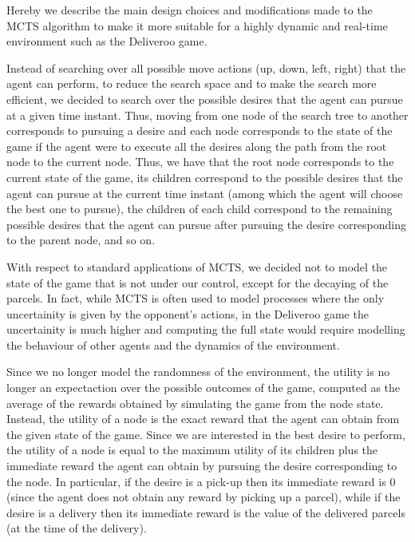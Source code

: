 Hereby we describe the main design choices and modifications made to the MCTS algorithm to make it more suitable for a highly dynamic and real-time environment such as the Deliveroo game.

Instead of searching over all possible move actions (up, down, left, right) that the agent can perform, to reduce the search space and to make the search more efficient, we decided to search over the possible desires that the agent can pursue at a given time instant. Thus, moving from one node of the search tree to another corresponds to pursuing a desire and each node corresponds to the state of the game if the agent were to execute all the desires along the path from the root node to the current node. Thus, we have that the root node corresponds to the current state of the game, its children correspond to the possible desires that the agent can pursue at the current time instant (among which the agent will choose the best one to pursue), the children of each child correspond to the remaining possible desires that the agent can pursue after pursuing the desire corresponding to the parent node, and so on.

With respect to standard applications of MCTS, we decided not to model the state of the game that is not under our control, except for the decaying of the parcels. In fact, while MCTS is often used to model processes where the only uncertainity is given by the opponent's actions, in the Deliveroo game the uncertainity is much higher and computing the full state would require modelling the behaviour of other agents and the dynamics of the environment.

Since we no longer model the randomness of the environment, the utility is no longer an expectaction over the possible outcomes of the game, computed as the average of the rewards obtained by simulating the game from the node state. Instead, the utility of a node is the exact reward that the agent can obtain from the given state of the game. Since we are interested in the best desire to perform, the utility of a node is equal to the maximum utility of its children plus the immediate reward the agent can obtain by pursuing the desire corresponding to the node. In particular, if the desire is a pick-up then its immediate reward is 0 (since the agent does not obtain any reward by picking up a parcel), while if the desire is a delivery then its immediate reward is the value of the delivered parcels (at the time of the delivery).

